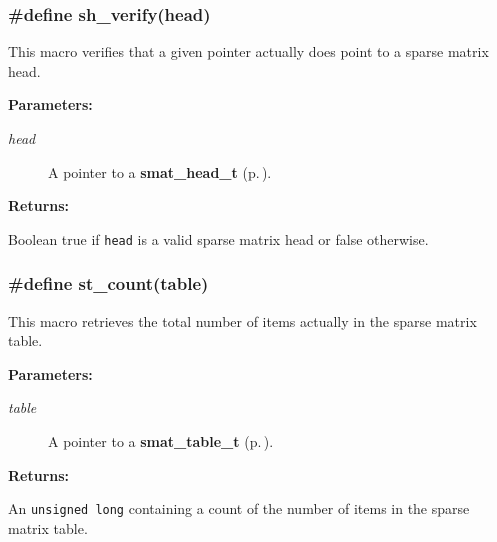 \subsubsection{\setlength{\rightskip}{0pt plus 5cm}\#define sh\_\-verify(head)}\label{group__dbprim__smat_a30}




 This macro verifies that a given pointer actually does point to a sparse matrix head.\begin{Desc}
\item[{\bf Parameters: }]\par
\begin{description}
\item[
{\em head}]A pointer to a {\bf smat\_\-head\_\-t} {\rm (p.\,\pageref{group__dbprim__smat_a1})}.

\end{description}
\end{Desc}
\begin{Desc}
\item[{\bf Returns: }]\par
Boolean true if {\tt head} is a valid sparse matrix head or false otherwise. \end{Desc}
\subsubsection{\setlength{\rightskip}{0pt plus 5cm}\#define st\_\-count(table)}\label{group__dbprim__smat_a26}




 This macro retrieves the total number of items actually in the sparse matrix table.\begin{Desc}
\item[{\bf Parameters: }]\par
\begin{description}
\item[
{\em table}]A pointer to a {\bf smat\_\-table\_\-t} {\rm (p.\,\pageref{group__dbprim__smat_a0})}.

\end{description}
\end{Desc}
\begin{Desc}
\item[{\bf Returns: }]\par
An {\tt unsigned long} containing a count of the number of items in the sparse matrix table. \end{Desc}
